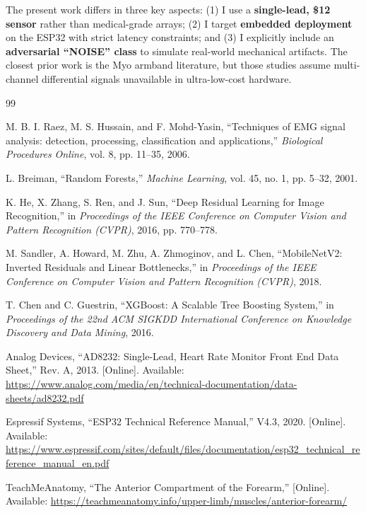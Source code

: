 \documentclass{article}
\begin{document}
The present work differs in three key aspects: (1) I use a \textbf{single-lead, \$12 sensor} rather than medical-grade arrays; (2) I target \textbf{embedded deployment} on the ESP32 with strict latency constraints; and (3) I explicitly include an \textbf{adversarial ``NOISE'' class} to simulate real-world mechanical artifacts. The closest prior work is the Myo armband literature, but those studies assume multi-channel differential signals unavailable in ultra-low-cost hardware.

\clearpage

\begin{thebibliography}{99}

M. B. I. Raez, M. S. Hussain, and F. Mohd-Yasin,
``Techniques of EMG signal analysis: detection, processing, classification and applications,''
\textit{Biological Procedures Online}, vol. 8, pp. 11–35, 2006.

L. Breiman,
``Random Forests,''
\textit{Machine Learning}, vol. 45, no. 1, pp. 5–32, 2001.

K. He, X. Zhang, S. Ren, and J. Sun,
``Deep Residual Learning for Image Recognition,''
in \textit{Proceedings of the IEEE Conference on Computer Vision and Pattern Recognition (CVPR)}, 2016, pp. 770–778.

M. Sandler, A. Howard, M. Zhu, A. Zhmoginov, and L. Chen,
``MobileNetV2: Inverted Residuals and Linear Bottlenecks,''
in \textit{Proceedings of the IEEE Conference on Computer Vision and Pattern Recognition (CVPR)}, 2018.

T. Chen and C. Guestrin,
``XGBoost: A Scalable Tree Boosting System,''
in \textit{Proceedings of the 22nd ACM SIGKDD International Conference on Knowledge Discovery and Data Mining}, 2016.

Analog Devices,
``AD8232: Single-Lead, Heart Rate Monitor Front End Data Sheet,''
Rev. A, 2013. [Online]. Available: \url{https://www.analog.com/media/en/technical-documentation/data-sheets/ad8232.pdf}

Espressif Systems,
``ESP32 Technical Reference Manual,''
V4.3, 2020. [Online]. Available: \url{https://www.espressif.com/sites/default/files/documentation/esp32_technical_reference_manual_en.pdf}

TeachMeAnatomy,
``The Anterior Compartment of the Forearm,''
[Online]. Available: \url{https://teachmeanatomy.info/upper-limb/muscles/anterior-forearm/}


\end{thebibliography}
\end{document}
